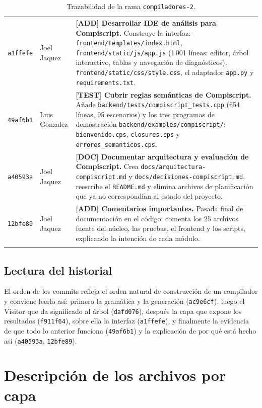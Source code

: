 \documentclass[11pt,a4paper]{article}
\begin{document}
\begin{longtable}{@{}p{1.6cm}L{2.7cm}L{9.1cm}@{}}
\texttt{a1ffefe} & Joel Jaquez &
\textbf{[ADD] Desarrollar IDE de análisis para Compiscript.} Construye la
interfaz: \texttt{frontend/templates/index.html},
\texttt{frontend/static/js/app.js} (1\,001 líneas: editor, árbol interactivo,
tablas y navegación de diagnósticos), \texttt{frontend/static/css/style.css},
el adaptador \texttt{app.py} y \texttt{requirements.txt}. \\
\addlinespace

\texttt{49af6b1} & Luis Gonzalez &
\textbf{[TEST] Cubrir reglas semánticas de Compiscript.} Añade
\texttt{backend/tests/compiscript\_tests.cpp} (654 líneas, 95 escenarios) y los
tres programas de demostración
\texttt{backend/examples/compiscript/}: \texttt{bienvenido.cps},
\texttt{closures.cps} y \texttt{errores\_semanticos.cps}. \\
\addlinespace

\texttt{a40593a} & Joel Jaquez &
\textbf{[DOC] Documentar arquitectura y evaluación de Compiscript.} Crea
\texttt{docs/arquitectura-compiscript.md} y
\texttt{docs/decisiones-compiscript.md}, reescribe el \texttt{README.md} y
elimina archivos de planificación que ya no correspondían al estado del
proyecto. \\
\addlinespace

\texttt{12bfe89} & Joel Jaquez &
\textbf{[ADD] Comentarios importantes.} Pasada final de documentación en el
código: comenta los 25 archivos fuente del núcleo, las pruebas, el frontend y
los scripts, explicando la intención de cada módulo. \\
\bottomrule
\caption{Trazabilidad de la rama \texttt{compiladores-2}.}
\end{longtable}

\subsection{Lectura del historial}

El orden de los commits refleja el orden natural de construcción de un
compilador y conviene leerlo así: primero la gramática y la generación
(\texttt{ac9e6cf}), luego el Visitor que da significado al árbol
(\texttt{dafd076}), después la capa que expone los resultados
(\texttt{f911f64}), sobre ella la interfaz (\texttt{a1ffefe}), y finalmente la
evidencia de que todo lo anterior funciona (\texttt{49af6b1}) y la explicación
de por qué está hecho así (\texttt{a40593a}, \texttt{12bfe89}).

\section{Descripción de los archivos por capa}
\end{document}
